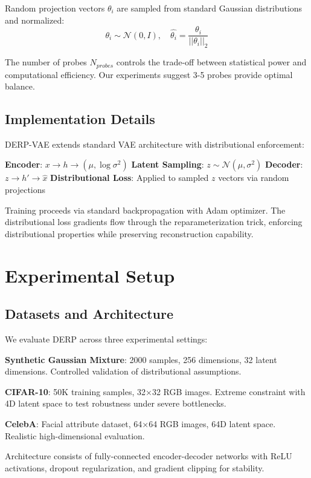 \documentclass[11pt]{article}
\begin{document}
Random projection vectors $\theta_i$ are sampled from standard Gaussian distributions and normalized:
\begin{equation}
\theta_i \sim \mathcal{N}(0, I), \quad \hat{\theta_i} = \frac{\theta_i}{||\theta_i||_2}
\end{equation}

The number of probes $N_{probes}$ controls the trade-off between statistical power and computational efficiency. Our experiments suggest 3-5 probes provide optimal balance.

\subsection{Implementation Details}

DERP-VAE extends standard VAE architecture with distributional enforcement:

\textbf{Encoder}: $x \rightarrow h \rightarrow (\mu, \log\sigma^2)$ 
\textbf{Latent Sampling}: $z \sim \mathcal{N}(\mu, \sigma^2)$
\textbf{Decoder}: $z \rightarrow h' \rightarrow \hat{x}$
\textbf{Distributional Loss}: Applied to sampled $z$ vectors via random projections

Training proceeds via standard backpropagation with Adam optimizer. The distributional loss gradients flow through the reparameterization trick, enforcing distributional properties while preserving reconstruction capability.

\section{Experimental Setup}

\subsection{Datasets and Architecture}

We evaluate DERP across three experimental settings:

\textbf{Synthetic Gaussian Mixture}: 2000 samples, 256 dimensions, 32 latent dimensions. Controlled validation of distributional assumptions.

\textbf{CIFAR-10}: 50K training samples, 32×32 RGB images. Extreme constraint with 4D latent space to test robustness under severe bottlenecks.

\textbf{CelebA}: Facial attribute dataset, 64×64 RGB images, 64D latent space. Realistic high-dimensional evaluation.

Architecture consists of fully-connected encoder-decoder networks with ReLU activations, dropout regularization, and gradient clipping for stability.
\end{document}
